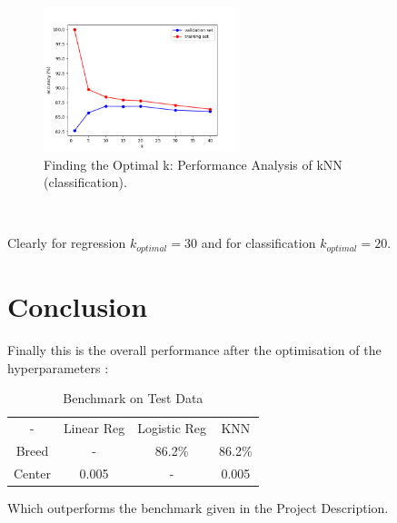 \documentclass[10pt,twocolumn]{article}
\begin{document}
\begin{figure}[htbp]
\centering
\includegraphics[width=0.5\textwidth]{KNNClassification.png}
\caption{Finding the Optimal k: Performance Analysis of kNN (classification). }
\label{fig:image4}
\end{figure} \

Clearly for regression \(k_{optimal} = 30\) and for classification \(k_{optimal} = 20\).

\section{Conclusion}
Finally this is the overall performance after the optimisation of the hyperparameters : 

\begin{table}[ht]
    \centering
    \begin{tabular}{cccc}
         -&  Linear Reg&  Logistic Reg& KNN\\
         Breed&  -&  86.2\%& 86.2\%\\
         Center&  0.005&  -& 0.005\\
    \end{tabular}
    \caption{Benchmark on Test Data}
    \label{tab:my_label}
\end{table}

Which outperforms the benchmark given in the Project Description.
\end{document}
